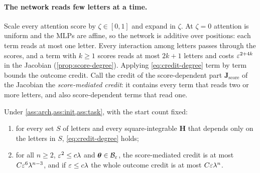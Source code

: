 \paragraph{The network reads few letters at a time.} Scale every attention score by $\zeta\in[0,1]$ and expand in $\zeta$. At $\zeta=0$ attention is uniform
and the MLPs are affine, so the network is additive over positions: each term reads at most one letter. Every interaction among letters
passes through the scores, and a term with $k\ge1$ scores reads at most $2k+1$ letters and costs $\varepsilon^{2+4k}$ in the Jacobian
(\cref{prop:score-degree}). Applying \cref{eq:credit-degree} term by term bounds the outcome credit. Call the credit of the score-dependent part
$\mathbf J_{\mathrm{score}}$ of the Jacobian the \emph{score-mediated credit}: it contains every term that reads two or more letters, and
also score-dependent terms that read one.

\begin{theorem}
\label{thm:main}
Under \cref{ass:arch,ass:init,ass:task}, with the start count fixed:
\begin{enumerate}[label=(\roman*),leftmargin=*,itemsep=0pt,topsep=2pt]
\item for every set $S$ of letters and every square-integrable $\mathbf H$ that depends only on the letters in $S$, \cref{eq:credit-degree} holds;
\item for all $n\ge2$, $\varepsilon^2\le c\lambda$ and $\bm\theta\in\mathcal B_{\varepsilon}$, the score-mediated credit is at most $C\varepsilon^6\lambda^{n-3}$, and if
$\varepsilon\le c\lambda$ the whole outcome credit is at most $C\varepsilon\lambda^n$.
\end{enumerate}
\end{theorem}

